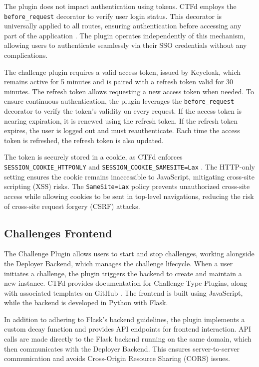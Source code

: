 The plugin does not impact authentication using tokens. CTFd employs the \texttt{before\_\allowbreak request} decorator to verify user login status. This decorator is universally applied to all routes, ensuring authentication before accessing any part of the application \Parencite{CTFdInitialization}. The plugin operates independently of this mechanism, allowing users to authenticate seamlessly via their SSO credentials without any complications.

The challenge plugin requires a valid access token, issued by Keycloak, which remains active for 5 minutes and is paired with a refresh token valid for 30 minutes. The refresh token allows requesting a new access token when needed. To ensure continuous authentication, the plugin leverages the \texttt{before\_\allowbreak request} decorator to verify the token's validity on every request. If the access token is nearing expiration, it is renewed using the refresh token. If the refresh token expires, the user is logged out and must reauthenticate. Each time the access token is refreshed, the refresh token is also updated.

The token is securely stored in a cookie, as CTFd enforces \texttt{SESSION\_COOKIE\_\allowbreak HTTPONLY} and \texttt{SESSION\_COOKIE\_SAMESITE=Lax} \Parencite{CTFdConfig}. The HTTP-only setting ensures the cookie remains inaccessible to JavaScript, mitigating cross-site scripting (XSS) risks. The \texttt{SameSite=Lax} policy prevents unauthorized cross-site access while allowing cookies to be sent in top-level navigations, reducing the risk of cross-site request forgery (CSRF) attacks.

\subsection{Challenges Frontend}
The Challenge Plugin allows users to start and stop challenges, working alongside the Deployer Backend, which manages the challenge lifecycle. When a user initiates a challenge, the plugin triggers the backend to create and maintain a new instance. CTFd provides documentation for Challenge Type Plugins, along with associated templates on GitHub \parencite{CTFdChallengeTypes}. The frontend is built using JavaScript, while the backend is developed in Python with Flask.

In addition to adhering to Flask's backend guidelines, the plugin implements a custom decay function and provides API endpoints for frontend interaction. API calls are made directly to the Flask backend running on the same domain, which then communicates with the Deployer Backend. This ensures server-to-server communication and avoids Cross-Origin Resource Sharing (CORS) issues.

